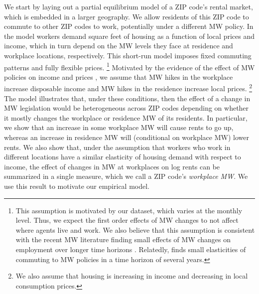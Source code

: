 We start by laying out a partial equilibrium model of a ZIP code's rental market,
which is embedded in a larger geography.
We allow residents of this ZIP code to commute to other ZIP codes to work, 
potentially under a different MW policy.
In the model workers demand square feet of housing as a function of local prices 
and income, which in turn depend on the MW levels they face at residence and 
workplace locations, respectively.
This short-run model imposes fixed commuting patterns and fully flexible prices.%
\footnote{This assumption is motivated by our dataset, which varies at the monthly
level. Thus, we expect the first order effects of MW changes to not affect where
agents live and work.
We also believe that this assumption is consistent with the recent MW literature
finding small effects of MW changes on employment over longer time horizons
\parencite[see][for a review]{Dube2019}.
Relatedly, \textcite{PerezPerez2021} finds small elasticities of commuting to MW 
policies in a time horizon of several years.}
Motivated by the evidence of the effect of MW policies on income and prices 
\parencite{AllegrettoReich2018, Leung2021}, we assume that MW hikes in the    %
workplace increase disposable income and MW hikes in the residence increase local 
prices.%
\footnote{We also assume that housing is increasing in income and decreasing in 
local consumption prices.}
The model illustrates that, under these conditions, then the effect of a change 
in MW legislation would be heterogeneous across ZIP codes depending on whether it 
mostly changes the workplace or residence MW of its residents.
In particular, we show that an increase in some workplace MW will cause rents to 
go up, whereas an increase in residence MW will (conditional on workplace MW) lower
rents.
We also show that, under the assumption that workers who work in different 
locations have a similar elasticity of housing demand with respect to income, the 
effect of changes in MW at workplaces on log rents can be summarized in a single 
measure, which we call a ZIP code's \textit{workplace MW}.
We use this result to motivate our empirical model.


